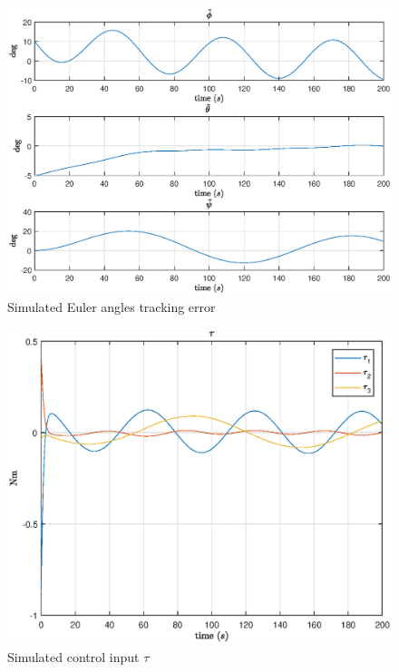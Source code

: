 \begin{figure}[h!]
    \centering
    \includegraphics[scale=0.7]{eulang_tilde2.eps}
    \caption{Simulated Euler angles tracking error}
    \label{fig:eulang_tilde2}
\end{figure}

\begin{figure}[h!]
    \centering
    \includegraphics[scale=0.95]{tau2.eps}
    \caption{Simulated control input $\tau$}
    \label{fig:tau2}
\end{figure}
